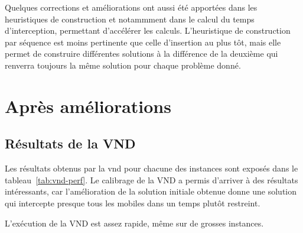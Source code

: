     	Quelques corrections et améliorations ont aussi été apportées dans les heuristiques de construction et notammment dans le calcul du temps d'interception, permettant d'accélérer les calculs. L'heuristique de construction par séquence est moins pertinente que celle d'insertion au plus tôt, mais elle permet de construire différentes solutions à la différence de la deuxième qui renverra toujours la même solution pour chaque problème donné.
    	
    \section{Après améliorations}
    	\subsection{Résultats de la VND}
		
		Les résultats obtenus par la \acrlong{vnd} pour chacune des instances sont exposés dans le tableau~\ref{tab:vnd-perf}. Le calibrage de la VND a permis d'arriver à des résultats intéressants, car l'amélioration de la solution initiale obtenue donne une solution qui intercepte presque tous les mobiles dans un temps plutôt restreint. 
		
		L'exécution de la VND est assez rapide, même sur de grosses instances.
		
